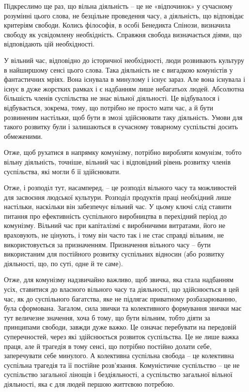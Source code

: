\documentclass[12pt,a4paper,openany]{book}
\begin{document}
Підкреслимо ще раз, що вільна діяльність – це не «відпочинок» у сучасному розумінні цього слова, не безцільне проведення часу, а діяльність, що відповідає критеріям свободи. Колись філософія, в особі Бенедикта Спінози, визначила свободу як усвідомлену необхідність. Справжня свобода визначається діями, що відповідають цій необхідності.

У вільний час, відповідно до історичної необхідності, люди розвивають культуру в найширшому сенсі цього слова. Така діяльність не є вигадкою комуністів у фантастичних мріях. Вона існувала в минулому і існує зараз. Але вона існувала і існує в дуже жорстких рамках і є надбанням лише небагатьох людей. Абсолютна більшість членів суспільства не знає вільної діяльності. Це відбувалося і відбувається, зокрема, тому, що потрібно не просто мати час, а й бути розвиненим настільки, щоб бути в змозі здійснювати таку діяльність. Умови для такого розвитку були і залишаються в сучасному товарному суспільстві досить обмеженими.

Отже, щоб рухатися в напрямку комунізму, потрібно виробляти комунізм, тобто вільну діяльність, точніше, вільний час і відповідний рівень розвитку членів суспільства, які могли б її здійснювати.

Отже, і розподіл тут, насамперед, – це розподіл вільного часу та можливостей для засвоєння людської культури. Розподіл продуктів праці необхідний лише настільки, наскільки він забезпечує вільний час. У цьому ключі слід ставити питання про ефективність суспільного виробництва в перехідний період до комунізму. Вільний час при капіталізмі є виробничими витратами, його не враховують, не цінують, і тому він часто так і не стає справді вільним, не використовується за призначенням. Призначення вільного часу – бути використаним для постійного розвитку суспільних відносин (або розвитку діяльності, що, по суті, одне й те саме).

Отже, для комунізму надзвичайно важливо, щоб звичка, яка стала надбанням усіх, ставитися до власного вільного часу та діяльності, що здійснюється в цей час, як до суспільного багатства, яке не підлягає приватному розбазарюванню, була сформована. Загалом, сила звички та колективного формування звички має тут величезне значення, хоча б тому, що бути вільним, тобто діяти за принципами свободи, завжди дуже важко. Це означає перебувати на передовій суперечностей, через які здійснюється розвиток суспільства. Це не лише важка праця, але й трагедія в тому сенсі, що потрібно постійно долати себе, заперечувати себе минулого. А колективна суспільна свобода – це колективна суспільна трагедія та її постійне розв’язання. Комуністичне суспільство – це не суспільство загальної лінощів і бездіяльності, а суспільство загальної вільної діяльності, яка є для людей першою життєвою потребою.
\end{document}
